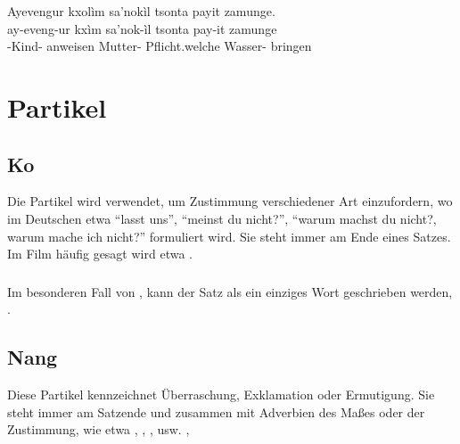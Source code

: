 \begin{interlin}
	\glll Ayevengur kxolìm sa'nokìl tsonta payit zamunge. \\
	ay-eveng-ur kxìm sa'nok-ìl tsonta pay-it zamunge \\
	-Kind- anweisen Mutter- Pflicht.welche Wasser- bringen \\
	 \Ipawl{}
\end{interlin}

\noindent{}

\section{Partikel}

\subsection{Ko} Die Partikel  wird verwendet, um Zustimmung verschiedener Art einzufordern, wo im Deutschen etwa ``lasst uns'', ``meinst du nicht?'', ``warum machst du nicht?, warum mache ich nicht?'' formuliert wird. Sie steht immer am Ende eines Satzes. Im Film häufig gesagt wird etwa  .
\label{syn:particle:ko}

\subsubsection{} Im besonderen Fall von  , kann der Satz als ein einziges Wort geschrieben werden, .

\subsection{Nang} Diese Partikel kennzeichnet Überraschung, Exklamation oder Ermutigung. Sie steht immer am Satzende und zusammen mit Adverbien des Maßes oder der Zustimmung, wie etwa , , , usw.  ,  

